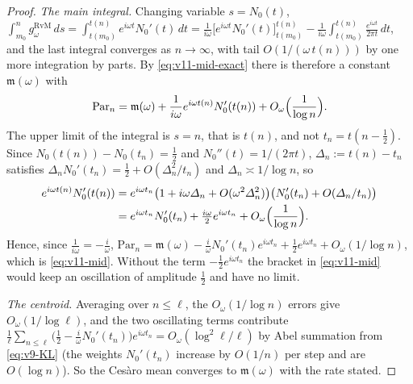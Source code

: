\documentclass[11pt,a4paper]{article}
\numberwithin{equation}{section}
\theoremstyle{definition}
\theoremstyle{remark}
\begin{document}
\begin{proof}
\emph{The main integral.} Changing variable $s=N_0(t)$,
$\int_{m_0}^ng^{\mathrm{RvM}}_\omega\,ds=\int_{t(m_0)}^{t(n)}e^{i\omega t}N_0'(t)\,dt=\frac1{i\omega}\bigl[e^{i\omega t}N_0'(t)\bigr]_{t(m_0)}^{t(n)}-\frac1{i\omega}\int_{t(m_0)}^{t(n)}\frac{e^{i\omega t}}{2\pi t}\,dt$, and the last integral converges as $n\to\infty$, with tail $O(1/(\omega\,t(n)))$ by one more integration by parts. By \eqref{eq:v11-mid-exact} there is therefore a constant $\mathfrak m(\omega)$ with
\begin{equation}
\mathrm{Par}_n=\mathfrak m(\omega)+\frac1{i\omega}e^{i\omega t(n)}N_0'(t(n))+O_\omega\Bigl(\frac1{\log n}\Bigr).
\end{equation}
The upper limit of the integral is $s=n$, that is $t(n)$, and not $t_n=t(n-\frac12)$. Since $N_0(t(n))-N_0(t_n)=\frac12$ and $N_0''(t)=1/(2\pi t)$, $\varDelta_n:=t(n)-t_n$ satisfies $\varDelta_nN_0'(t_n)=\frac12+O(\varDelta_n^2/t_n)$ and $\varDelta_n\asymp1/\log n$, so
\begin{equation}
\begin{aligned}
e^{i\omega t(n)}N_0'(t(n))&=e^{i\omega t_n}\bigl(1+i\omega\varDelta_n+O(\omega^2\varDelta_n^2)\bigr)\bigl(N_0'(t_n)+O(\varDelta_n/t_n)\bigr)\\
&=e^{i\omega t_n}N_0'(t_n)+\tfrac{i\omega}2e^{i\omega t_n}+O_\omega\Bigl(\frac1{\log n}\Bigr).
\end{aligned}
\end{equation}
Hence, since $\frac1{i\omega}=-\frac i\omega$,
$\mathrm{Par}_n=\mathfrak m(\omega)-\frac i\omega N_0'(t_n)e^{i\omega t_n}+\frac12e^{i\omega t_n}+O_\omega(1/\log n)$, which is \eqref{eq:v11-mid}. Without the term $-\frac12e^{i\omega t_n}$ the bracket in \eqref{eq:v11-mid} would keep an oscillation of amplitude $\frac12$ and have no limit.

\emph{The centroid.} Averaging over $n\le\ell$, the $O_\omega(1/\log n)$ errors give $O_\omega(1/\log\ell)$, and the two oscillating terms contribute $\frac1\ell\sum_{n\le\ell}\bigl(\frac12-\frac i\omega N_0'(t_n)\bigr)e^{i\omega t_n}=O_\omega(\log^2\ell/\ell)$ by Abel summation from \eqref{eq:v9-KL} (the weights $N_0'(t_n)$ increase by $O(1/n)$ per step and are $O(\log n)$). So the Ces\`aro mean converges to $\mathfrak m(\omega)$ with the rate stated.
\end{proof}
\end{document}
